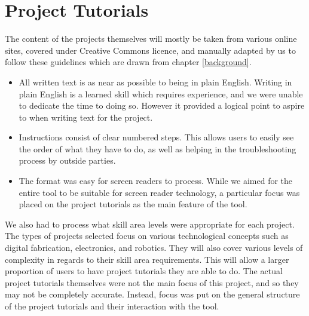 \documentclass{l4proj}
\begin{document}



\section{Project Tutorials}
The content of the projects themselves will mostly be taken from various online sites, covered under Creative Commons licence, and manually adapted by us to follow these guidelines which are drawn from chapter \ref{background}. 
\begin{itemize}
    \item All written text is as near as possible to being in plain English. Writing in plain English is a learned skill which requires experience, and we were unable to dedicate the time to doing so. However it provided a logical point to aspire to when writing text for the project.
    \item Instructions consist of clear numbered steps. This allows users to easily see the order of what they have to do, as well as helping in the troubleshooting process by outside parties. 
    \item The format was easy for screen readers to process. While we aimed for the entire tool to be suitable for screen reader technology, a particular focus was placed on the project tutorials as the main feature of the tool. 
\end{itemize}
We also had to process what skill area levels were appropriate for each project. 
The types of projects selected focus on various technological concepts such as digital fabrication, electronics, and robotics. They will also cover various levels of complexity in regards to their skill area requirements. This will allow a larger proportion of users to have project tutorials they are able to do. 
The actual project tutorials themselves were not the main focus of this project, and so they may not be completely accurate. Instead, focus was put on the general structure of the project tutorials and their interaction with the tool. 
\end{document}
